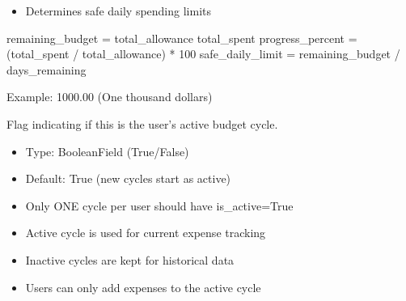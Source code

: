 \documentclass[letterpaper,10pt,english]{sphinxmanual}
\begin{document}
\begin{fulllineitems}
\begin{fulllineitems}
\begin{description}
\begin{itemize}
\item {} 
\sphinxAtStartPar
Determines safe daily spending limits

\end{itemize}

\sphinxAtStartPar
remaining\_budget = total\_allowance \sphinxhyphen{} total\_spent
progress\_percent = (total\_spent / total\_allowance) * 100
safe\_daily\_limit = remaining\_budget / days\_remaining

\end{description}

\sphinxAtStartPar
Example: 1000.00 (One thousand dollars)

\end{fulllineitems}


\begin{fulllineitems}
\label{\detokenize{expensesApp:id9}}
\pysigstartsignatures
\pysigline
{}
\pysigstopsignatures
\sphinxAtStartPar
Flag indicating if this is the user’s active budget cycle.
\begin{description}
\begin{itemize}
\item {} 
\sphinxAtStartPar
Type: BooleanField (True/False)

\item {} 
\sphinxAtStartPar
Default: True (new cycles start as active)

\end{itemize}

\begin{itemize}
\item {} 
\sphinxAtStartPar
Only ONE cycle per user should have is\_active=True

\item {} 
\sphinxAtStartPar
Active cycle is used for current expense tracking

\item {} 
\sphinxAtStartPar
Inactive cycles are kept for historical data

\item {} 
\sphinxAtStartPar
Users can only add expenses to the active cycle

\end{itemize}


\end{description}
\end{fulllineitems}
\end{fulllineitems}
\end{document}

